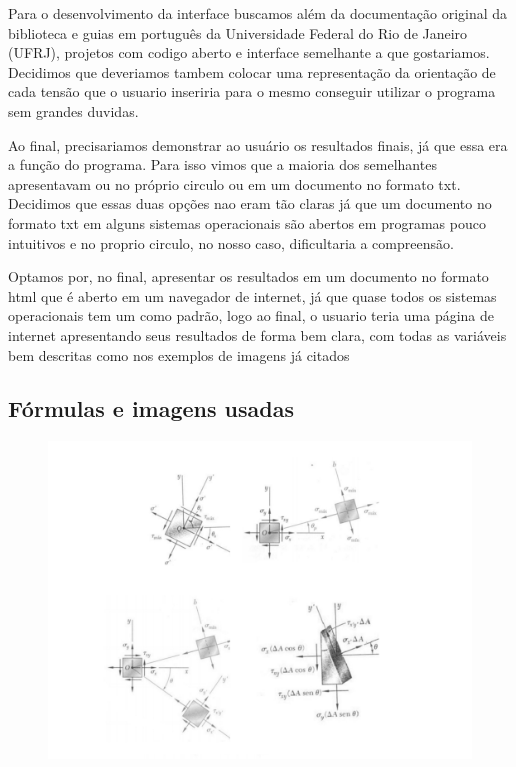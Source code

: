 \documentclass[a4paper]{article}
\begin{document}
Para o desenvolvimento da interface buscamos além da documentação original da biblioteca e guias em português da Universidade Federal do Rio de Janeiro (UFRJ), projetos com codigo aberto e interface semelhante a que gostariamos. Decidimos que deveriamos tambem colocar uma representação da orientação de cada tensão que o usuario inseriria para o mesmo conseguir utilizar o programa sem grandes duvidas.

Ao final, precisariamos demonstrar ao usuário os resultados finais, já que essa era a função do programa. Para isso vimos que a maioria dos semelhantes apresentavam ou no próprio circulo ou em um documento no formato txt. Decidimos que essas duas opções nao eram tão claras já que um documento no formato txt em alguns sistemas operacionais são abertos em programas pouco intuitivos e no proprio circulo, no nosso caso, dificultaria a compreensão. 

Optamos por, no final, apresentar os resultados em um documento no formato html que é aberto em um navegador de internet, já que quase todos os sistemas operacionais tem um como padrão, logo ao final, o usuario teria uma página de internet apresentando seus resultados de forma bem clara, com todas as variáveis bem descritas como nos exemplos de imagens já citados



\label{subsec: Fórmulas}

	\subsection{Fórmulas e imagens usadas}

		\begin{figure}[!htb]
			\centering
			\includegraphics[scale = 0.4]{imagem1}
		\end{figure}	
\end{document}
